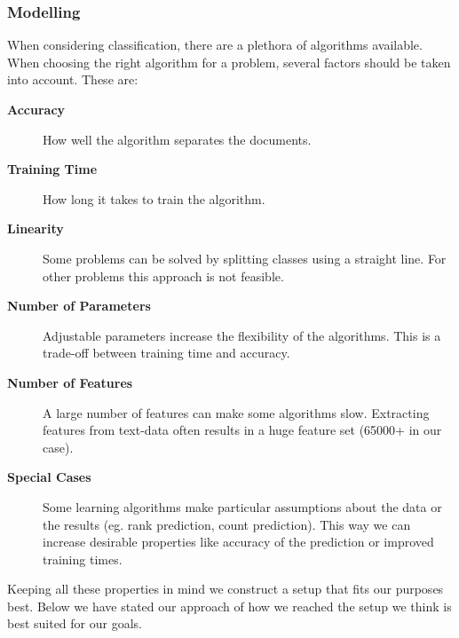 \subsubsection{Modelling}
When considering classification, there are a plethora of algorithms available. When choosing the right algorithm for a problem, several factors should be taken into account\cite{MLCheatSheet}. These are:
    \begin{description}
        \item[\textbf{Accuracy}] How well the algorithm separates the documents.
        \item[\textbf{Training Time}] How long it takes to train the algorithm.
        \item[\textbf{Linearity}] Some problems can be solved by splitting classes using a straight line. For other problems this approach is not feasible.
        \item[\textbf{Number of Parameters}] Adjustable parameters increase the flexibility of the algorithms. This is a trade-off between training time and accuracy.
        \item[\textbf{Number of Features}] A large number of features can make some algorithms slow. Extracting features from text-data often results in a huge feature set (65000+ in our case).
        \item[\textbf{Special Cases}] Some learning algorithms make particular assumptions about the data or the results (eg. rank prediction, count prediction). This way we can increase desirable properties like accuracy of the prediction or improved training times. 
    \end{description}

Keeping all these properties in mind we construct a setup that fits our purposes best.
Below we have stated our approach of how we reached the setup we think is best suited for our goals.


